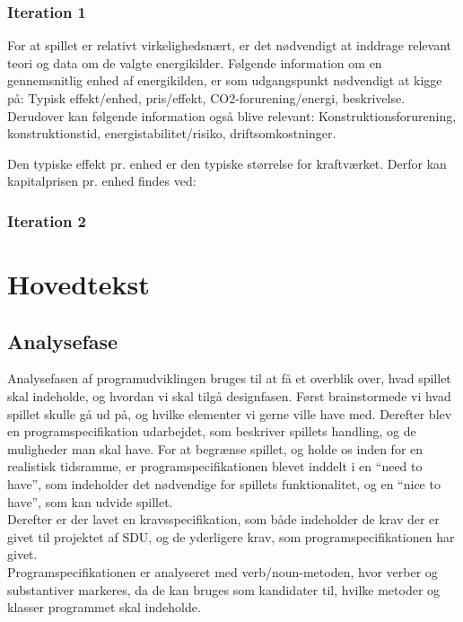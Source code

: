 \documentclass[a4paper,12pt]{report}
\begin{document}
\subsubsection{Iteration 1}
For at spillet er relativt virkelighedsnært, er det nødvendigt at inddrage relevant teori og data om de valgte energikilder. Følgende information om en gennemsnitlig enhed af energikilden, er som udgangspunkt nødvendigt at kigge på: Typisk effekt/enhed, pris/effekt, CO2-forurening/energi, beskrivelse. Derudover kan følgende information også blive relevant: Konstruktionsforurening, konstruktionstid, energistabilitet/risiko, driftsomkostninger.


Den typiske effekt pr. enhed er den typiske størrelse for kraftværket. Derfor kan kapitalprisen pr. enhed findes ved:


\subsubsection{Iteration 2}

\section{Hovedtekst}
\subsection{Analysefase}
Analysefasen af programudviklingen bruges til at få et overblik over, hvad spillet skal indeholde, og hvordan vi skal tilgå designfasen. Først brainstormede vi hvad spillet skulle gå ud på, og hvilke elementer vi gerne ville have med. Derefter blev en programspecifikation udarbejdet, som beskriver spillets handling, og de muligheder man skal have. For at begrænse spillet, og holde os inden for en realistisk tidsramme, er programspecifikationen blevet inddelt i  en “need to have”, som indeholder det nødvendige for spillets funktionalitet,  og en “nice to have”, som kan udvide spillet.\\
Derefter er der lavet en kravsspecifikation, som både indeholder de krav der er givet til projektet af SDU, og de yderligere krav, som programspecifikationen har givet. \\
Programspecifikationen er analyseret med verb/noun-metoden, hvor verber og substantiver markeres, da de kan bruges som kandidater til, hvilke metoder og klasser programmet skal indeholde.
\end{document}
